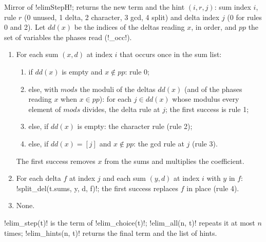 {{{\begin{algorithm}\label{alg:lean-export-sym-elim}
Mirror of \lexlean!elimStepH!; returns the new term and the hint $(i, r, j)$: sum index $i$, rule
$r$ (0 unused, 1 delta, 2 character, 3 gcd, 4 split) and delta index $j$ (0 for rules 0 and 2).
Let $dd(x)$ be the indices of the deltas reading $x$, in order, and $pp$ the set of variables
the phases read (\lexpy!_occ!).
\begin{enumerate}
\item For each sum $(x, d)$ at index $i$ that occurs once in the sum list:
\begin{enumerate}
\item if $dd(x)$ is empty and $x\notin pp$: rule 0;
\item else, with $\mathit{mods}$ the moduli of the deltas $dd(x)$ (and of the phases reading
$x$ when $x \in pp$): for each $j \in dd(x)$ whose modulus every element of $\mathit{mods}$
divides, the delta rule at $j$; the first success is rule 1;
\item else, if $dd(x)$ is empty: the character rule (rule 2);
\item else, if $dd(x) = [j]$ and $x \notin pp$: the gcd rule at $j$ (rule 3).
\end{enumerate}
The first success removes $x$ from the sums and multiplies the coefficient.
\item For each delta $f$ at index $j$ and each sum $(y, d)$ at index $i$ with $y$ in $f$:
\lexpy!split_del(t.sums, y, d, f)!; the first success replaces $f$ in place (rule 4).
\item None.
\end{enumerate}
\lexpy!elim_step(t)! is the term of \lexpy!elim_choice(t)!; \lexpy!elim_all(n, t)! repeats it at most
$n$ times; \lexpy!elim_hints(n, t)! returns the final term and the list of hints.
\end{algorithm}

}}}
